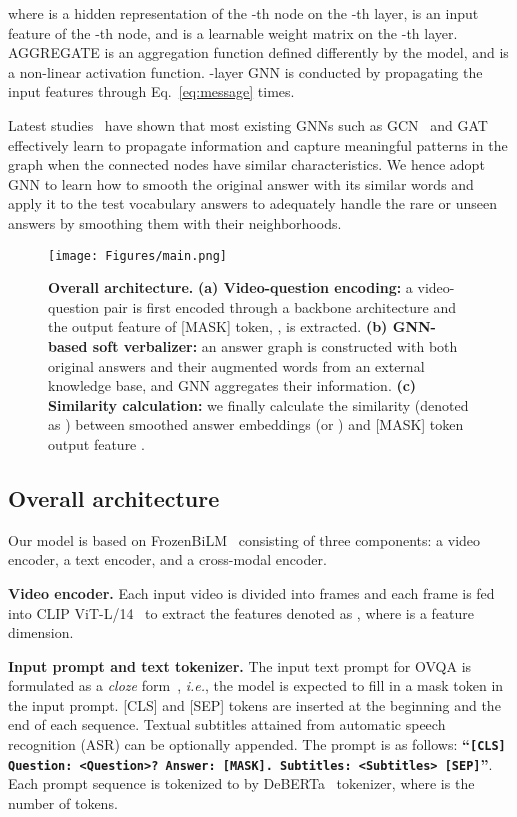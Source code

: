 \documentclass[10pt,twocolumn,letterpaper]{article}
\begin{document}
where  is a hidden representation of the -th node on the -th layer,  is an input feature of the -th node, and  is a learnable weight matrix on the -th layer.
AGGREGATE is an aggregation function defined differently by the model, and  is a non-linear activation function.
-layer GNN is conducted by propagating the input features through Eq.~\eqref{eq:message}  times.

Latest studies~\cite{li2018deeper,wu2019simplifying} have shown that most existing GNNs such as GCN~\cite{kipf2016semi} and GAT~\cite{velivckovic2017graph} effectively learn to propagate information and capture meaningful patterns in the graph when the connected nodes have similar characteristics.
We hence adopt GNN to learn how to smooth the original answer with its similar words and apply it to the test vocabulary answers to adequately handle the rare or unseen answers by smoothing them with their neighborhoods. \begin{figure}[t] 
    \centering
    \texttt{[image: Figures/main.png]}
    \caption{\textbf{Overall architecture.} 
    \textbf{(a) Video-question encoding:} a video-question pair is first encoded through a backbone architecture and the output feature of [MASK] token, , is extracted.
    \textbf{(b) GNN-based soft verbalizer:} an answer graph is constructed with both original answers and their augmented words from an external knowledge base, and GNN aggregates their information.
    \textbf{(c) Similarity calculation:} we finally calculate the similarity (denoted as ) between smoothed answer embeddings  (or ) and [MASK] token output feature .
    }
    \label{fig:main}
\end{figure} \subsection{Overall architecture}

Our model is based on FrozenBiLM~\cite{yang2022zero} consisting of three components: a video encoder, a text encoder, and a cross-modal encoder.

\noindent \textbf{Video encoder.}
Each input video is divided into  frames and each frame is fed into CLIP ViT-L/14~\cite{radford2021learning, dosovitskiy2020image} to extract the features denoted as , where  is a feature dimension.

\noindent \textbf{Input prompt and text tokenizer.}
The input text prompt for OVQA is formulated as a \textit{cloze} form~\cite{schick2021exploiting, taylor1953cloze}, \textit{i.e.}, the model is expected to fill in a mask token in the input prompt. 
[CLS] and [SEP] tokens are inserted at the beginning and the end of each sequence.
Textual subtitles attained from automatic speech recognition (ASR) can be optionally appended.
The prompt is as follows: {\small \textbf{``\texttt{[CLS] Question: <Question>? Answer: [MASK]. Subtitles: <Subtitles> [SEP]}''}}.
Each prompt sequence is tokenized to  by DeBERTa~\cite{he2020deberta} tokenizer, where  is the number of tokens.
\end{document}
